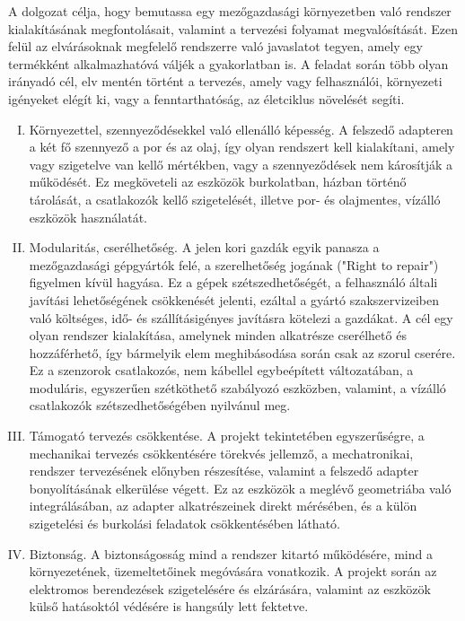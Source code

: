 A dolgozat célja, hogy bemutassa egy mezőgazdasági környezetben való rendszer kialakításának megfontolásait, valamint a tervezési folyamat megvalósítását. Ezen felül az elvárásoknak megfelelő rendszerre való javaslatot tegyen, amely egy termékként alkalmazhatóvá váljék a gyakorlatban is.
A feladat során több olyan irányadó cél, elv mentén történt a tervezés, amely vagy felhasználói, környezeti igényeket elégít ki, vagy a fenntarthatóság, az életciklus növelését segíti.
\begin{enumerate}[I.]
	\item Környezettel, szennyeződésekkel való ellenálló képesség. A felszedő adapteren a két fő szennyező a por és az olaj, így olyan rendszert kell kialakítani, amely vagy szigetelve van kellő mértékben, vagy a szennyeződések nem károsítják a működését. Ez megköveteli az eszközök burkolatban, házban történő tárolását, a csatlakozók kellő szigetelését, illetve por- és olajmentes, vízálló eszközök használatát.
	\item Modularitás, cserélhetőség. A jelen kori gazdák egyik panasza a mezőgazdasági gépgyártók felé, a szerelhetőség jogának ("Right to repair") figyelmen kívül hagyása. Ez a gépek szétszedhetőségét, a felhasználó általi javítási lehetőségének csökkenését jelenti, ezáltal a gyártó szakszervizeiben való költséges, idő- és szállításigényes javításra kötelezi a gazdákat. A cél egy olyan rendszer kialakítása, amelynek minden alkatrésze cserélhető és hozzáférhető, így bármelyik elem meghibásodása során csak az szorul cserére. Ez a szenzorok csatlakozós, nem kábellel egybeépített változatában, a moduláris, egyszerűen szétköthető szabályozó eszközben, valamint, a vízálló csatlakozók szétszedhetőségében nyilvánul meg.
	\item Támogató tervezés csökkentése. A projekt tekintetében egyszerűségre, a mechanikai tervezés csökkentésére törekvés jellemző, a mechatronikai, rendszer tervezésének előnyben részesítése, valamint a felszedő adapter bonyolításának elkerülése végett. Ez az eszközök a meglévő geometriába való integrálásában, az adapter alkatrészeinek direkt mérésében, és a külön szigetelési és burkolási feladatok csökkentésében látható.
	\item Biztonság. A biztonságosság mind a rendszer kitartó működésére, mind a környezetének, üzemeltetőinek megóvására vonatkozik. A projekt során az elektromos berendezések szigetelésére és elzárására, valamint az eszközök külső hatásoktól védésére is hangsúly lett fektetve.
\end{enumerate}

